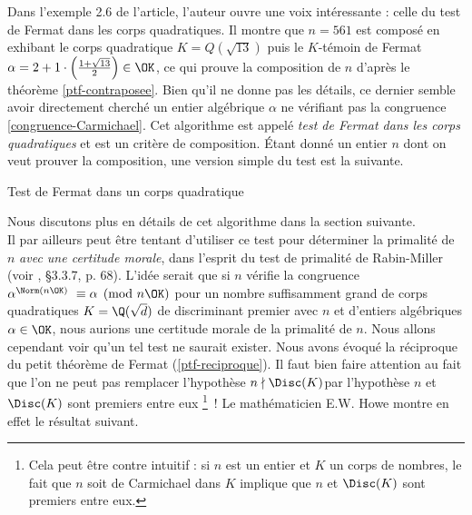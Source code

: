 Dans l'exemple 2.6 de l'article, l'auteur ouvre une voix intéressante : celle du test de Fermat dans les corps quadratiques. Il montre que $n = 561$ est composé en exhibant le corps quadratique $K = Q(\sqrt{13})$ puis le $K$-témoin de Fermat $\alpha = 2 + 1\cdot \left(\frac{1 + \sqrt{13}}{2}\right) \in \OK$, ce qui prouve la composition de $n$ d'après le théorème \ref{ptf-contraposee}. Bien qu'il ne donne pas les détails, ce dernier semble avoir directement cherché un entier algébrique $\alpha$ ne vérifiant pas la congruence \ref{congruence-Carmichael}. Cet algorithme est appelé \emph{test de Fermat dans les corps quadratiques} et est un critère de composition. Étant donné un entier $n$ dont on veut prouver la composition, une version simple du test est la suivante.

\vspace{1em}
\begin{algorithm}[H]\label{test-Fermat-quadratique}
\caption{Test de Fermat dans un corps quadratique}
\end{algorithm}
\vspace{1em}

Nous discutons plus en détails de cet algorithme dans la section suivante. \\

Il par ailleurs peut être tentant d'utiliser ce test pour déterminer la primalité de $n$ \emph{avec une certitude morale}, dans l'esprit du  test de primalité de Rabin-Miller (voir \cite{Demazure}, §3.3.7, p. 68). L'idée serait que si $n$ vérifie la congruence $\alpha^{\Norm(n\OK)} \equiv \alpha \pmod{n\OK}$ pour un nombre \og suffisamment grand \fg{} de corps quadratiques $K = \Q(\sqrt{d})$ de discriminant premier avec $n$ et d'entiers algébriques $\alpha \in \OK$, nous aurions une certitude morale de la primalité de $n$. Nous allons cependant voir qu'un tel test ne saurait exister. Nous avons évoqué la réciproque du petit théorème de Fermat (\ref{ptf-reciproque}). Il faut bien faire attention au fait que l'on ne peut pas remplacer l'hypothèse \og $n \nmid \Disc(K)$\fg par l'hypothèse \og $n$ et $\Disc(K)$ sont premiers entre eux \fg \footnote{Cela peut être contre intuitif : si $n$ est un entier et $K$ un corps de nombres, le fait que $n$ soit de Carmichael dans $K$ implique que $n$ et $\Disc(K)$ sont premiers entre eux.}~! Le mathématicien E.W. Howe montre en effet le résultat suivant.

